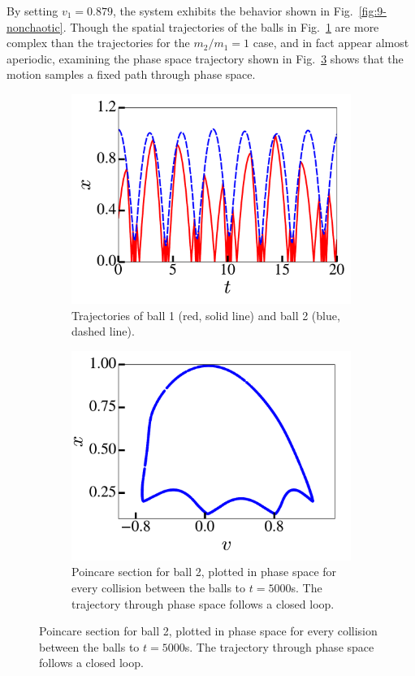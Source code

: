 \documentclass[pra,twocolumn,showpacs,amsmath,amssymb, aps, 10pt]{revtex4-1}
\begin{document}
By setting
$v_1 = 0.879$, the system exhibits the behavior shown in Fig.~\ref{fig:9-nonchaotic}.
Though the spatial trajectories of the balls in Fig.~\ref{fig:9-traj-nonchaotic}
are more complex than the trajectories for the $m_2/m_1 = 1$ case, and in fact
appear almost aperiodic, examining the phase space trajectory shown in
Fig.~\ref{fig:9-poincare-nonchaotic} shows that the motion samples a fixed path
through phase space.

\begin{figure}
  \begin{subfigure}{0.8\linewidth}
    \includegraphics[width=\linewidth]{nonchaotic_r0_1_traj}
    \caption{Trajectories of ball 1 (red, solid line) and ball 2 (blue, dashed line).}
    \label{fig:9-traj-nonchaotic}
  \end{subfigure}

  \begin{subfigure}{0.8\linewidth}
    \includegraphics[width=\linewidth]{nonchaotic_r0_1_poincare}
    \caption{Poincare section for ball 2, plotted in phase space for every collision
    between the balls to $t=5000$s. The trajectory through phase space follows a
    closed loop.}
    \label{fig:9-poincare-nonchaotic}
  \end{subfigure}


\end{figure}
\end{document}
